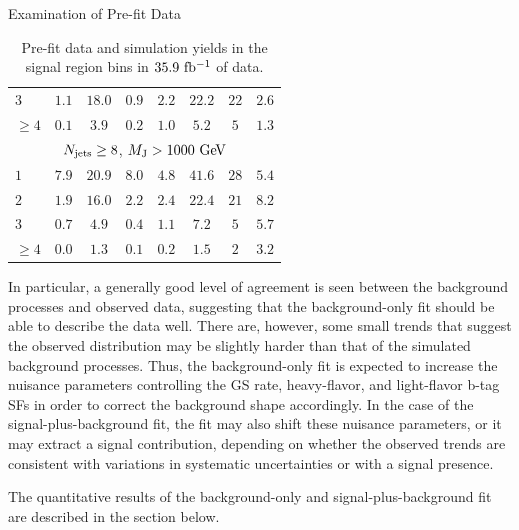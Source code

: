 \begin{section}{Examination of Pre-fit Data}
\begin{table}
\begin{tabular}[tbp!]{ l | c  c  c  c | c |  c | c  }
$3$       &  $1.1$    &  $18.0$   &  $0.9$    &  $2.2$   &  $22.2$    &  $22$   &  $2.6$ \\
$\geq 4$  &  $0.1$    &  $3.9$    &  $0.2$    &  $1.0$   &  $5.2$     &  $5$    &  $1.3$ \\
\hline
\multicolumn{8}{c}{$N_{\mathrm{jets}} \geq 8$, $M_{\mathrm{J}} > 1000~\mathrm{Ge\kern -0.1em V}$} \\
\hline
$1$       &  $7.9$    &  $20.9$   &  $8.0$    &  $4.8$   &  $41.6$    &  $28$   &  $5.4$ \\
$2$       &  $1.9$    &  $16.0$   &  $2.2$    &  $2.4$   &  $22.4$    &  $21$   &  $8.2$ \\
$3$       &  $0.7$    &  $4.9$    &  $0.4$    &  $1.1$   &  $7.2$     &  $5$    &  $5.7$ \\
$\geq 4$  &  $0.0$    &  $1.3$    &  $0.1$    &  $0.2$   &  $1.5$     &  $2$    &  $3.2$ \\
\hline
\hline
\end{tabular}
\caption{Pre-fit data and simulation yields in the signal region bins in $35.9~\mathrm{fb^{-1}}$ of data.}
\label{tab:prefit_sr}
\end{table}

In particular, a generally good level of agreement is seen between the background processes and observed data, suggesting that the background-only fit should be able to describe the data well.
There are, however, some small trends that suggest the observed \Nb distribution may be slightly harder than that of the simulated background processes.
Thus, the background-only fit is expected to increase the nuisance parameters controlling the GS rate, heavy-flavor, and light-flavor b-tag SFs in order to correct the background shape accordingly.
In the case of the signal-plus-background fit, the fit may also shift these nuisance parameters, or it may extract a signal contribution, depending on whether the observed trends are consistent with variations in systematic uncertainties or with a signal presence.

The quantitative results of the background-only and signal-plus-background fit are described in the section below.

\end{section}

